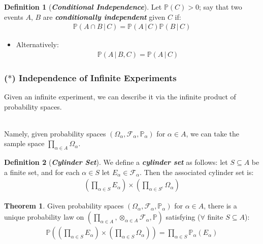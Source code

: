 \documentclass[12pt]{extarticle}
\newcommand{\pstart}[0]{\noindent}
\newcommand{\term}[1]{\textbf{\textit{#1}}}
\theoremstyle{definition}
\newtheorem*{definition}{Definition}
\newtheorem*{theorem}{Theorem}
\theoremstyle{remark}
\newcommand{\prob}[1]{\mathbb{P}\left(#1\right)}
\newcommand{\cond}[2]{#1\,\vert\,#2}
\begin{document}
\begin{definition}[\term{Conditional Independence}]
    Let $\prob{C}>0$; say that two events $A$, $B$ are \term{conditionally 
independent} given $C$ if: \begin{align*}
        \prob{\cond{A\cap B}{C}}=\prob{\cond{A}{C}}\prob{\cond{B}{C}}
    \end{align*} \begin{itemize}
        \item Alternatively: \begin{align*}
            \prob{\cond{A}{B,C}}=\prob{\cond{A}{C}}
        \end{align*}
    \end{itemize}
\end{definition}

\subsubsection{($\ast$) Independence of Infinite Experiments}
Given an infinite experiment, we can describe it via the infinite product 
of probability spaces. 

~\\ \pstart
Namely, given probability spaces 
$(\Omega_\alpha,\mathcal{F}_\alpha,\mathbb{P}_\alpha)$ for $\alpha\in A$, 
we can take the sample space $\prod_{\alpha\in A}\Omega_\alpha$.

\begin{definition}[\term{Cylinder Set}]
    We define a \term{cylinder set} as follows: let $S\subseteq A$ be a 
finite set, and for each $\alpha\in S$ let 
$E_\alpha\in\mathcal{F}_\alpha$. Then the associated cylinder set is: 
\begin{align*}
        \left(\prod_{\alpha\in 
S}E_\alpha\right)\times\left(\prod_{\alpha\in S^c}\Omega_\alpha\right)
    \end{align*}
\end{definition}
\begin{theorem}
    Given probability spaces 
$(\Omega_\alpha,\mathcal{F}_\alpha,\mathbb{P}_\alpha)$ for $\alpha\in A$, 
there is a unique probability law on $(\prod_{\alpha\in 
A},\otimes_{\alpha\in A}\mathcal{F}_\alpha,\mathbb{P})$ satisfying 
($\forall$ finite $S\subseteq A$): \begin{align*}
        \prob{\left(\prod_{\alpha\in 
S}E_\alpha\right)\times\left(\prod_{\alpha\in 
S}\Omega_\alpha\right)}=\prod_{\alpha\in S}\mathbb{P}_\alpha(E_\alpha)
    \end{align*}
\end{theorem}
\end{document}
